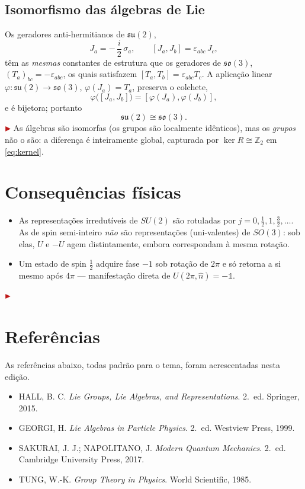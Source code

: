 \documentclass[12pt,a4paper]{article}
\newcommand{\marcador}{\ensuremath{\color{corDestaque}\blacktriangleright}\,}
\newcommand{\add}[1]{{\marcador\color{corDestaque}#1}}
\newenvironment{nota}{\par\color{corDestaque}\noindent\marcador\ignorespaces}{\par}
\newcommand{\Z}{\mathbb{Z}}
\newcommand{\id}{\mathbb{1}}                 %
\newcommand{\su}{\mathfrak{su}}
\newcommand{\so}{\mathfrak{so}}
\newcommand{\vn}{\hat{n}}
\newcommand{\comm}[2]{\left[#1,#2\right]}
\theoremstyle{definition}
\theoremstyle{plain}
\theoremstyle{remark}
\begin{document}
\subsection*{Isomorfismo das álgebras de Lie}
Os geradores anti-hermitianos de $\su(2)$,
\[
  J_a=-\,\frac{i}{2}\,\sigma_a,
  \qquad
  \comm{J_a}{J_b}=\varepsilon_{abc}\,J_c,
\]
têm as \emph{mesmas} constantes de estrutura que os geradores de $\so(3)$,
$(T_a)_{bc}=-\varepsilon_{abc}$, os quais satisfazem
$\comm{T_a}{T_b}=\varepsilon_{abc}T_c$. A aplicação linear
$\varphi:\su(2)\to\so(3)$, $\varphi(J_a)=T_a$, preserva o colchete,
\[
  \varphi\bigl(\comm{J_a}{J_b}\bigr)=\comm{\varphi(J_a)}{\varphi(J_b)},
\]
e é bijetora; portanto
\begin{equation}\label{eq:isoalg}
  \su(2)\cong\so(3).
\end{equation}
\add{As álgebras são isomorfas (os grupos são localmente idênticos), mas os
\emph{grupos} não o são: a diferença é inteiramente global, capturada por
$\ker R\cong\Z_2$ em \eqref{eq:kernel}.}

\section{Consequências físicas}
\begin{itemize}[leftmargin=1.6em,itemsep=2pt]
  \item As representações irredutíveis de $SU(2)$ são rotuladas por
        $j=0,\tfrac12,1,\tfrac32,\dots$. As de spin semi-inteiro
        \emph{não} são representações (uni-valentes) de $SO(3)$: sob elas,
        $U$ e $-U$ agem distintamente, embora correspondam à mesma rotação.
  \item Um estado de spin $\tfrac12$ adquire fase $-1$ sob rotação de
        $2\pi$ e só retorna a si mesmo após $4\pi$ — manifestação direta de
        $U(2\pi,\vn)=-\id$.
\end{itemize}

\begin{nota}
\section*{Referências}
As referências abaixo, todas padrão para o tema, foram acrescentadas nesta
edição.
\begin{itemize}[leftmargin=1.6em,itemsep=2pt]
  \item HALL, B. C. \emph{Lie Groups, Lie Algebras, and Representations}.
        2.~ed. Springer, 2015.
  \item GEORGI, H. \emph{Lie Algebras in Particle Physics}.
        2.~ed. Westview Press, 1999.
  \item SAKURAI, J. J.; NAPOLITANO, J. \emph{Modern Quantum Mechanics}.
        2.~ed. Cambridge University Press, 2017.
  \item TUNG, W.-K. \emph{Group Theory in Physics}. World Scientific, 1985.
\end{itemize}
\end{nota}
\end{document}
